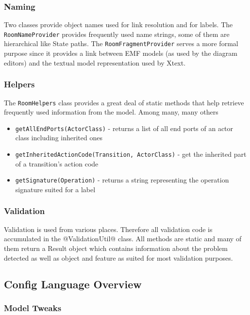 \subsubsection{Naming}

Two classes provide object names used for link resolution and for labels.
The \texttt{RoomNameProvider} provides frequently used name strings, some of them are hierarchical like 
State paths.
The \texttt{RoomFragmentProvider} serves a more formal purpose since it provides a link between EMF models 
(as used by the diagram editors) and the textual model representation used by Xtext.

\subsubsection{Helpers}

The \texttt{RoomHelpers} class provides a great deal of static methods that help retrieve frequently used 
information from the model.
Among many, many others
\begin{itemize}
\item \texttt{getAllEndPorts(ActorClass)} - returns a list of all end ports of an actor class including 
inherited ones
\item \texttt{getInheritedActionCode(Transition, ActorClass)} - get the inherited part of a transition's 
action code
\item \texttt{getSignature(Operation)} - returns a string representing the operation signature suited for 
a label
\end{itemize}

\subsubsection{Validation}

Validation is used from various places. Therefore all validation code is accumulated in the 
@ValidationUtil@ class. All methods are static and many of them return a Result object which contains 
information about the problem detected as well as object and feature as suited for most validation purposes.

\subsection{Config Language Overview}

\subsubsection{Model Tweaks}

